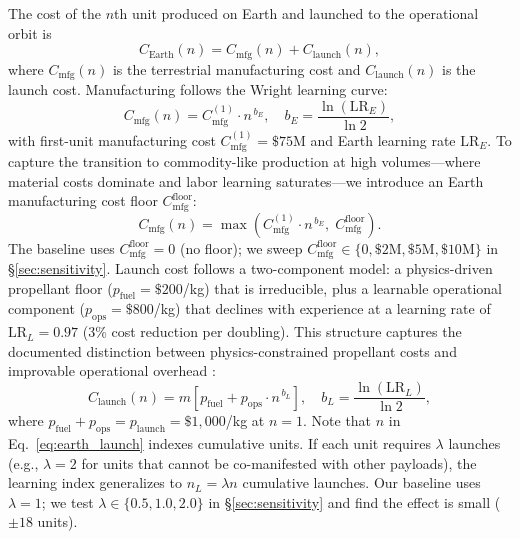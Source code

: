\documentclass[preprint,12pt]{elsarticle}
\begin{document}
The cost of the $n$th unit produced on Earth and launched to the operational orbit is
\begin{equation}
  C_{\mathrm{Earth}}(n) = C_{\mathrm{mfg}}(n) + C_{\mathrm{launch}}(n),
  \label{eq:earth_unit}
\end{equation}
where $C_{\mathrm{mfg}}(n)$ is the terrestrial manufacturing cost and $C_{\mathrm{launch}}(n)$ is the launch cost. Manufacturing follows the Wright learning curve:
\begin{equation}
  C_{\mathrm{mfg}}(n) = C_{\mathrm{mfg}}^{(1)} \cdot n^{\,b_E}, \quad b_E = \frac{\ln(\mathrm{LR}_E)}{\ln 2},
  \label{eq:earth_mfg}
\end{equation}
with first-unit manufacturing cost $C_{\mathrm{mfg}}^{(1)} = \$75$M and Earth learning rate $\mathrm{LR}_E$. To capture the transition to commodity-like production at high volumes---where material costs dominate and labor learning saturates---we introduce an Earth manufacturing cost floor $C_{\mathrm{mfg}}^{\mathrm{floor}}$:
\begin{equation}
  C_{\mathrm{mfg}}(n) = \max\!\left(C_{\mathrm{mfg}}^{(1)} \cdot n^{\,b_E},\; C_{\mathrm{mfg}}^{\mathrm{floor}}\right).
  \label{eq:earth_mfg_floor}
\end{equation}
The baseline uses $C_{\mathrm{mfg}}^{\mathrm{floor}} = 0$ (no floor); we sweep $C_{\mathrm{mfg}}^{\mathrm{floor}} \in \{0, \$2\text{M}, \$5\text{M}, \$10\text{M}\}$ in \S\ref{sec:sensitivity}. Launch cost follows a two-component model: a physics-driven propellant floor ($p_{\mathrm{fuel}} = \$200$/kg) that is irreducible, plus a learnable operational component ($p_{\mathrm{ops}} = \$800$/kg) that declines with experience at a learning rate of $\mathrm{LR}_L = 0.97$ (3\% cost reduction per doubling). This structure captures the documented distinction between physics-constrained propellant costs and improvable operational overhead \cite{zapata2019}:
\begin{equation}
  C_{\mathrm{launch}}(n) = m \left[ p_{\mathrm{fuel}} + p_{\mathrm{ops}} \cdot n^{\,b_L} \right], \quad b_L = \frac{\ln(\mathrm{LR}_L)}{\ln 2},
  \label{eq:earth_launch}
\end{equation}
where $p_{\mathrm{fuel}} + p_{\mathrm{ops}} = p_{\mathrm{launch}} = \$1{,}000$/kg at $n = 1$. Note that $n$ in Eq.~\ref{eq:earth_launch} indexes cumulative units. If each unit requires $\lambda$ launches (e.g., $\lambda = 2$ for units that cannot be co-manifested with other payloads), the learning index generalizes to $n_L = \lambda n$ cumulative launches. Our baseline uses $\lambda = 1$; we test $\lambda \in \{0.5, 1.0, 2.0\}$ in \S\ref{sec:sensitivity} and find the effect is small ($\pm 18$ units).
\end{document}
